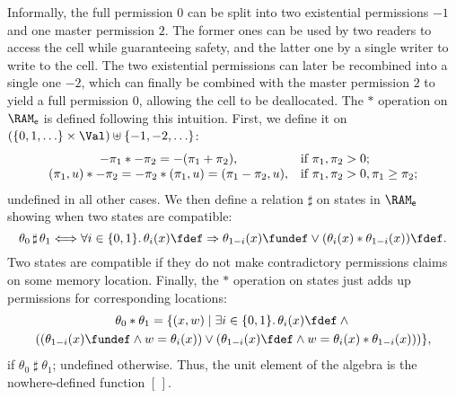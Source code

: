 Informally, the full permission $0$ can be split into two existential permissions $-1$
and one master permission $2$. The former ones can be used by two readers to
access the cell while guaranteeing safety, and the latter one by a single writer
to write to the cell. The two existential permissions can later be recombined
into a single one $-2$, which can finally be combined with the master permission
$2$ to yield a full permission $0$, allowing the cell to be deallocated. The $*$
operation on $\RAM_{\sf e}$ is defined following this intuition. First, we
define it on $(\{0, 1, \ldots\} \times \Val) \uplus
\{-1, -2, \ldots\}$:
$$
\begin{array}{c@{\quad}l}
{-\pi_1} * {-\pi_2} = -(\pi_1+\pi_2), &\mbox{if } \pi_1, \pi_2 > 0;
\\
(\pi_1, u) * {-\pi_2} = {-\pi_2} * (\pi_1, u) = (\pi_1-\pi_2, u), &
\mbox{if } \pi_1, \pi_2 > 0, \pi_1 \ge \pi_2;
\end{array}
$$
undefined in all other cases. We then define a relation $\sharp$ on states in
$\RAM_{\sf e}$ showing when two states are compatible:
$$
\theta_0 \mathop{\sharp} \theta_1 \Longleftrightarrow
\forall i \in \{0, 1\}.\, {\theta_i(x) \fdef} \Rightarrow 
{\theta_{1-i}(x) \fundef} \vee {(\theta_i(x) * \theta_{1-i}(x)) \fdef}.
$$
Two states are compatible if they do not make contradictory permissions claims
on some memory location. Finally, the $*$ operation on states just adds up
permissions for corresponding locations:
\begin{multline*}
\theta_0 * \theta_1 = \{(x, w) \mid 
\exists i \in \{0, 1\}.\, {\theta_i(x) \fdef} \wedge{}\\
(({\theta_{1-i}(x) \fundef} \wedge w = \theta_i(x)) \vee 
({\theta_{1-i}(x) \fdef} \wedge w = \theta_i(x) * \theta_{1-i}(x)))
\},
\end{multline*}
if $\theta_0 \mathrel{\sharp} \theta_1$; undefined otherwise. Thus, the unit
element of the algebra is the nowhere-defined function $[\,]$.

